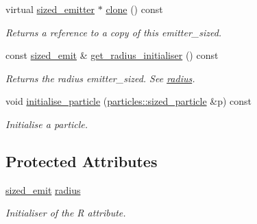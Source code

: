 \begin{DoxyCompactItemize}
\mbox{\label{classphysim_1_1emitters_1_1sized__emitter_abc17295e37d7e39e54dc5253bae3d311}} 
virtual \hyperlink{classphysim_1_1emitters_1_1sized__emitter}{sized\+\_\+emitter} $\ast$ \hyperlink{classphysim_1_1emitters_1_1sized__emitter_abc17295e37d7e39e54dc5253bae3d311}{clone} () const
\begin{DoxyCompactList}\small\item\em Returns a reference to a copy of this emitter\+\_\+sized. \end{DoxyCompactList}\item 
\mbox{\label{classphysim_1_1emitters_1_1sized__emitter_a4e42158ded4164506d97dabaca3538ff}} 
const \hyperlink{namespacephysim_1_1emitters_a924fdfab5324762db7bded5f2877ff87}{sized\+\_\+emit} \& \hyperlink{classphysim_1_1emitters_1_1sized__emitter_a4e42158ded4164506d97dabaca3538ff}{get\+\_\+radius\+\_\+initialiser} () const
\begin{DoxyCompactList}\small\item\em Returns the radius emitter\+\_\+sized. See \hyperlink{classphysim_1_1emitters_1_1sized__emitter_a85a42d5a2e35fe7831ab889e1f4a4a45}{radius}. \end{DoxyCompactList}\item 
void \hyperlink{classphysim_1_1emitters_1_1sized__emitter_a94ce8e25bc26f8294659a89f5bc90cec}{initialise\+\_\+particle} (\hyperlink{classphysim_1_1particles_1_1sized__particle}{particles\+::sized\+\_\+particle} \&p) const
\begin{DoxyCompactList}\small\item\em Initialise a particle. \end{DoxyCompactList}\end{DoxyCompactItemize}
\subsection*{Protected Attributes}
\begin{DoxyCompactItemize}
\item 
\mbox{\label{classphysim_1_1emitters_1_1sized__emitter_a85a42d5a2e35fe7831ab889e1f4a4a45}} 
\hyperlink{namespacephysim_1_1emitters_a924fdfab5324762db7bded5f2877ff87}{sized\+\_\+emit} \hyperlink{classphysim_1_1emitters_1_1sized__emitter_a85a42d5a2e35fe7831ab889e1f4a4a45}{radius}
\begin{DoxyCompactList}\small\item\em Initialiser of the \textquotesingle{}R\textquotesingle{} attribute. \end{DoxyCompactList}\end{DoxyCompactItemize}


